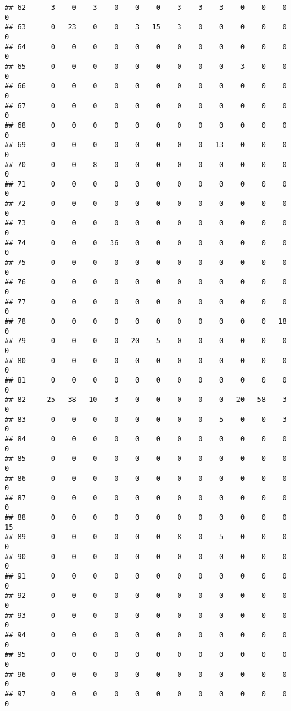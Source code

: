 \documentclass[]{article}
\begin{document}
\begin{verbatim}
## 62      3    0    3    0    0    0    3    3    3    0    0    0    0
## 63      0   23    0    0    3   15    3    0    0    0    0    0    0
## 64      0    0    0    0    0    0    0    0    0    0    0    0    0
## 65      0    0    0    0    0    0    0    0    0    3    0    0    0
## 66      0    0    0    0    0    0    0    0    0    0    0    0    0
## 67      0    0    0    0    0    0    0    0    0    0    0    0    0
## 68      0    0    0    0    0    0    0    0    0    0    0    0    0
## 69      0    0    0    0    0    0    0    0   13    0    0    0    0
## 70      0    0    8    0    0    0    0    0    0    0    0    0    0
## 71      0    0    0    0    0    0    0    0    0    0    0    0    0
## 72      0    0    0    0    0    0    0    0    0    0    0    0    0
## 73      0    0    0    0    0    0    0    0    0    0    0    0    0
## 74      0    0    0   36    0    0    0    0    0    0    0    0    0
## 75      0    0    0    0    0    0    0    0    0    0    0    0    0
## 76      0    0    0    0    0    0    0    0    0    0    0    0    0
## 77      0    0    0    0    0    0    0    0    0    0    0    0    0
## 78      0    0    0    0    0    0    0    0    0    0    0   18    0
## 79      0    0    0    0   20    5    0    0    0    0    0    0    0
## 80      0    0    0    0    0    0    0    0    0    0    0    0    0
## 81      0    0    0    0    0    0    0    0    0    0    0    0    0
## 82     25   38   10    3    0    0    0    0    0   20   58    3    0
## 83      0    0    0    0    0    0    0    0    5    0    0    3    0
## 84      0    0    0    0    0    0    0    0    0    0    0    0    0
## 85      0    0    0    0    0    0    0    0    0    0    0    0    0
## 86      0    0    0    0    0    0    0    0    0    0    0    0    0
## 87      0    0    0    0    0    0    0    0    0    0    0    0    0
## 88      0    0    0    0    0    0    0    0    0    0    0    0   15
## 89      0    0    0    0    0    0    8    0    5    0    0    0    0
## 90      0    0    0    0    0    0    0    0    0    0    0    0    0
## 91      0    0    0    0    0    0    0    0    0    0    0    0    0
## 92      0    0    0    0    0    0    0    0    0    0    0    0    0
## 93      0    0    0    0    0    0    0    0    0    0    0    0    0
## 94      0    0    0    0    0    0    0    0    0    0    0    0    0
## 95      0    0    0    0    0    0    0    0    0    0    0    0    0
## 96      0    0    0    0    0    0    0    0    0    0    0    0    0
## 97      0    0    0    0    0    0    0    0    0    0    0    0    0

\end{verbatim}
\end{document}
